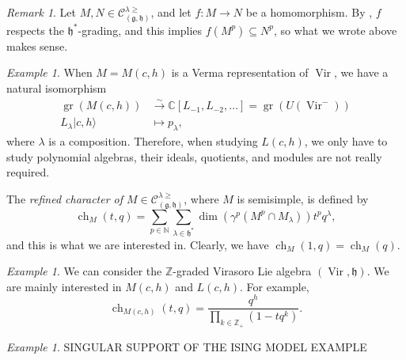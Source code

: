 \documentclass[a4paper, 12pt, reqno]{amsart}
\theoremstyle{remark}
\newtheorem{remark}[theorem]{Remark}
\newtheorem{example}[theorem]{Example}
\DeclareMathOperator{\Vir}{Vir}
\DeclareMathOperator{\ch}{ch}
\DeclareMathOperator{\gr}{gr}
\begin{document}
\begin{remark}
  \label{rmk:2}
  Let $M, N \in \mathcal{C}^{\lambda \ge}_{(\mathfrak{g}, \mathfrak{h})}$, and let $f: M \to N$ be a homomorphism.
  By , $f$ respects the $\mathfrak{h}^*$-grading, and this implies $f(M^p) \subseteq N^p$, so what we wrote above makes sense.
\end{remark}

\begin{example}
  \label{exa:4}
  When $M = M(c, h)$ is a Verma representation of $\Vir$, we have a natural isomorphism
  \begin{align*}
    \gr(M(c, h)) &\xrightarrow{\sim} \mathbb{C}[L_{-1}, L_{-2}, \dots] = \gr(U(\Vir^{-})) \\
    L_{\lambda}|c, h\rangle & \mapsto p_{\lambda},
  \end{align*}
  where $\lambda$ is a composition.
  Therefore, when studying $L(c, h)$, we only have to study polynomial algebras, their ideals, quotients, and modules are not really required.
\end{example}

The \emph{refined character of $M \in \mathcal{C}^{\lambda \ge}_{(\mathfrak{g}, \mathfrak{h})}$}, where $M$ is semisimple, is defined by
\begin{equation*}
  \ch_M(t, q) = \sum_{p \in \mathbb{N}}\sum_{\lambda \in \mathfrak{h}^*}\dim(\gamma^p(M^p \cap M_{\lambda}))t^pq^{\lambda},
\end{equation*}
and this is what we are interested in.
Clearly, we have $\ch_M(1, q) = \ch_M(q)$.

\begin{example}
  \label{exa:5}
  We can consider the $\mathbb{Z}$-graded Virasoro Lie algebra $(\Vir, \mathfrak{h})$.
  We are mainly interested in $M(c, h)$ and $L(c, h)$.
  For example,
  \begin{equation*}
    \ch_{M(c, h)}(t, q) = \frac{q^h}{\prod_{k \in \mathbb{Z}_+}(1 - tq^k)}.
  \end{equation*}
\end{example}

\begin{example}
  \label{exa:6}
  SINGULAR SUPPORT OF THE ISING MODEL EXAMPLE
\end{example}
\end{document}

